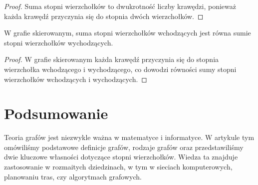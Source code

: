 \documentclass[12pt]{article}
\begin{document}
\begin{proof}
Suma stopni wierzchołków to dwukrotność liczby krawędzi, ponieważ każda krawędź przyczynia się do stopnia dwóch wierzchołków.
\end{proof}

\begin{theorem}
W grafie skierowanym, suma stopni wierzchołków wchodzących jest równa sumie stopni wierzchołków wychodzących.
\end{theorem}

\begin{proof}
W grafie skierowanym każda krawędź przyczynia się do stopnia wierzchołka wchodzącego i wychodzącego, co dowodzi równości sumy stopni wierzchołków wchodzących i wychodzących.
\end{proof}

\section{Podsumowanie}
Teoria grafów jest niezwykle ważna w matematyce i informatyce. W artykule tym omówiliśmy podstawowe definicje grafów, rodzaje grafów oraz przedstawiliśmy dwie kluczowe własności dotyczące stopni wierzchołków. Wiedza ta znajduje zastosowanie w rozmaitych dziedzinach, w tym w sieciach komputerowych, planowaniu tras, czy algorytmach grafowych.
\end{document}
